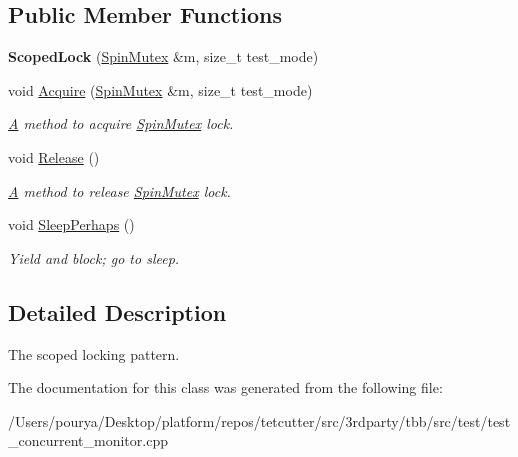 \subsection*{Public Member Functions}
\begin{DoxyCompactItemize}
\item 
\hypertarget{classSpinMutex_1_1ScopedLock_aabddb31145cd00e3cab524f8516d30b6}{}{\bfseries Scoped\+Lock} (\hyperlink{classSpinMutex}{Spin\+Mutex} \&m, size\+\_\+t test\+\_\+mode)\label{classSpinMutex_1_1ScopedLock_aabddb31145cd00e3cab524f8516d30b6}

\item 
\hypertarget{classSpinMutex_1_1ScopedLock_a10c15953e5398fa097198eb253850e17}{}void \hyperlink{classSpinMutex_1_1ScopedLock_a10c15953e5398fa097198eb253850e17}{Acquire} (\hyperlink{classSpinMutex}{Spin\+Mutex} \&m, size\+\_\+t test\+\_\+mode)\label{classSpinMutex_1_1ScopedLock_a10c15953e5398fa097198eb253850e17}

\begin{DoxyCompactList}\small\item\em \hyperlink{structA}{A} method to acquire \hyperlink{classSpinMutex}{Spin\+Mutex} lock. \end{DoxyCompactList}\item 
\hypertarget{classSpinMutex_1_1ScopedLock_a2e8fcdabd943d549676caef274c43cb6}{}void \hyperlink{classSpinMutex_1_1ScopedLock_a2e8fcdabd943d549676caef274c43cb6}{Release} ()\label{classSpinMutex_1_1ScopedLock_a2e8fcdabd943d549676caef274c43cb6}

\begin{DoxyCompactList}\small\item\em \hyperlink{structA}{A} method to release \hyperlink{classSpinMutex}{Spin\+Mutex} lock. \end{DoxyCompactList}\item 
\hypertarget{classSpinMutex_1_1ScopedLock_a95342d7057d2563872e2f5c01e876d65}{}void \hyperlink{classSpinMutex_1_1ScopedLock_a95342d7057d2563872e2f5c01e876d65}{Sleep\+Perhaps} ()\label{classSpinMutex_1_1ScopedLock_a95342d7057d2563872e2f5c01e876d65}

\begin{DoxyCompactList}\small\item\em Yield and block; go to sleep. \end{DoxyCompactList}\end{DoxyCompactItemize}


\subsection{Detailed Description}
The scoped locking pattern. 

The documentation for this class was generated from the following file\+:\begin{DoxyCompactItemize}
\item 
/\+Users/pourya/\+Desktop/platform/repos/tetcutter/src/3rdparty/tbb/src/test/test\+\_\+concurrent\+\_\+monitor.\+cpp\end{DoxyCompactItemize}
